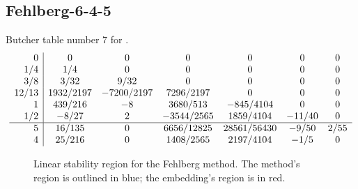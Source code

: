 \documentclass[letterpaper,10pt,english]{sphinxmanual}
\begin{document}
\subsection{Fehlberg-6-4-5}
\label{Butcher:butcher-fehlberg}\label{Butcher:fehlberg-6-4-5}
Butcher table number 7
for {\hyperref[c_interface/User_callable:c.ARKodeSetERKTableNum]{\emph{}}}.
\begin{gather}
\begin{split}\begin{array}{r|cccccc}
  0 & 0 & 0 & 0 & 0 & 0 & 0 \\
  1/4 & 1/4 & 0 & 0 & 0 & 0 & 0 \\
  3/8 & 3/32 & 9/32 & 0 & 0 & 0 & 0 \\
  12/13 & 1932/2197 & -7200/2197 & 7296/2197 & 0 & 0 & 0 \\
  1 & 439/216 & -8 & 3680/513 & -845/4104 & 0 & 0 \\
  1/2 & -8/27 & 2 & -3544/2565 & 1859/4104 & -11/40 & 0 \\
  \hline
  5 & 16/135 & 0 & 6656/12825 & 28561/56430 & -9/50 & 2/55 \\
  4 & 25/216 & 0 & 1408/2565 & 2197/4104 & -1/5 & 0
\end{array}\end{split}\notag
\end{gather}\begin{figure}[htbp]
\centering
\capstart

\caption{Linear stability region for the Fehlberg method.  The method's
region is outlined in blue; the embedding's region is in red.}\end{figure}
\end{document}
